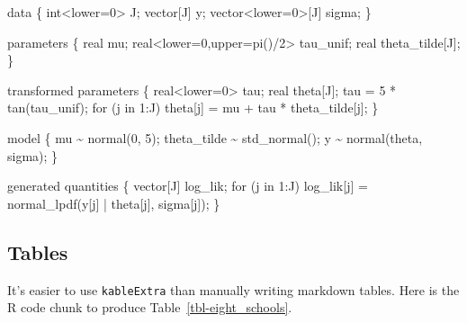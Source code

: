 \documentclass[
  12pt,
  letterpaper,
  DIV=11,
  numbers=noendperiod]{scrartcl}
\newenvironment{Shaded}{\begin{snugshade}}{\end{snugshade}}
\newcommand{\ControlFlowTok}[1]{\textcolor[rgb]{0.00,0.23,0.31}{#1}}
\newcommand{\DataTypeTok}[1]{\textcolor[rgb]{0.68,0.00,0.00}{#1}}
\newcommand{\DecValTok}[1]{\textcolor[rgb]{0.68,0.00,0.00}{#1}}
\newcommand{\KeywordTok}[1]{\textcolor[rgb]{0.00,0.23,0.31}{#1}}
\newcommand{\NormalTok}[1]{\textcolor[rgb]{0.00,0.23,0.31}{#1}}
\begin{document}
\begin{Shaded}
\begin{Highlighting}[]
\KeywordTok{data}\NormalTok{ \{}
  \DataTypeTok{int}\NormalTok{\textless{}}\KeywordTok{lower}\NormalTok{=}\DecValTok{0}\NormalTok{\textgreater{} J;}
  \DataTypeTok{vector}\NormalTok{[J] y;}
  \DataTypeTok{vector}\NormalTok{\textless{}}\KeywordTok{lower}\NormalTok{=}\DecValTok{0}\NormalTok{\textgreater{}[J] sigma;}
\NormalTok{\}}

\KeywordTok{parameters}\NormalTok{ \{}
  \DataTypeTok{real}\NormalTok{ mu;}
  \DataTypeTok{real}\NormalTok{\textless{}}\KeywordTok{lower}\NormalTok{=}\DecValTok{0}\NormalTok{,}\KeywordTok{upper}\NormalTok{=pi()/}\DecValTok{2}\NormalTok{\textgreater{} tau\_unif;}
  \DataTypeTok{real}\NormalTok{ theta\_tilde[J];}
\NormalTok{\}}

\KeywordTok{transformed parameters}\NormalTok{ \{}
  \DataTypeTok{real}\NormalTok{\textless{}}\KeywordTok{lower}\NormalTok{=}\DecValTok{0}\NormalTok{\textgreater{} tau;}
  \DataTypeTok{real}\NormalTok{ theta[J];}
\NormalTok{  tau = }\DecValTok{5}\NormalTok{ * tan(tau\_unif);}
  \ControlFlowTok{for}\NormalTok{ (j }\ControlFlowTok{in} \DecValTok{1}\NormalTok{:J)}
\NormalTok{    theta[j] = mu + tau * theta\_tilde[j];}
\NormalTok{\}}

\KeywordTok{model}\NormalTok{ \{}
\NormalTok{  mu \textasciitilde{} normal(}\DecValTok{0}\NormalTok{, }\DecValTok{5}\NormalTok{);}
\NormalTok{  theta\_tilde \textasciitilde{} std\_normal();}
\NormalTok{  y \textasciitilde{} normal(theta, sigma);}
\NormalTok{\}}

\KeywordTok{generated quantities}\NormalTok{ \{}
  \DataTypeTok{vector}\NormalTok{[J] log\_lik;}
  \ControlFlowTok{for}\NormalTok{ (j }\ControlFlowTok{in} \DecValTok{1}\NormalTok{:J) log\_lik[j] = normal\_lpdf(y[j] | theta[j], sigma[j]);}
\NormalTok{\}}
\end{Highlighting}
\end{Shaded}

\hypertarget{tables}{%
\subsection{Tables}\label{tables}}

It's easier to use \texttt{kableExtra} than manually writing markdown
tables. Here is the R code chunk to produce
Table~\ref{tbl-eight_schools}.
\end{document}
